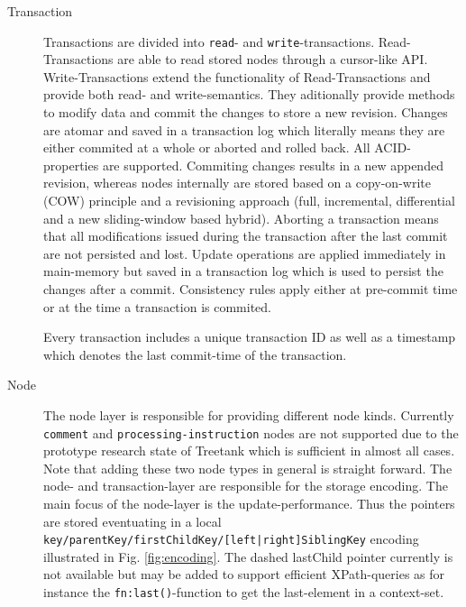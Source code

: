 \begin{description}
\item[Transaction] Transactions are divided into \texttt{read}- and \texttt{write}-transactions. Read-Transactions are able to read stored nodes through a cursor-like API. Write-Transactions extend the functionality of Read-Transactions and provide both read- and write-semantics. They aditionally provide methods to modify data and commit the changes to store a new revision. Changes are atomar and saved in a transaction log which literally means they are either commited at a whole or aborted and rolled back. All ACID-properties are supported. Commiting changes results in a new appended revision, whereas nodes internally are stored based on a copy-on-write (COW) principle and a revisioning approach (full, incremental, differential and a new sliding-window based hybrid). Aborting a transaction means that all modifications issued during the transaction after the last commit are not persisted and lost. Update operations are applied immediately in main-memory but saved in a transaction log which is used to persist the changes after a commit. Consistency rules apply either at pre-commit time or at the time a transaction is commited.

Every transaction includes a unique transaction ID as well as a timestamp which denotes the last commit-time of the transaction.

\item[Node] The node layer is responsible for providing different node kinds. Currently \texttt{comment} and \texttt{processing-instruction} nodes are not supported due to the prototype research state of Treetank which is sufficient in almost all cases. Note that adding these two node types in general is straight forward. The node- and transaction-layer are responsible for the storage encoding. The main focus of the node-layer is the update-performance. Thus the pointers are stored eventuating in a local \\\texttt{key/parentKey/firstChildKey/[left|right]SiblingKey} encoding illustrated in Fig. \ref{fig:encoding}. The dashed lastChild pointer currently is not available but may be added to support efficient XPath-queries as for instance the \texttt{fn:last()}-function to get the last-element in a context-set. 



\end{description}
